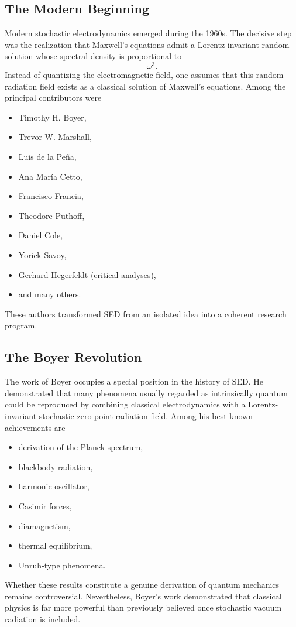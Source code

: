\subsection{The Modern Beginning}
Modern stochastic electrodynamics emerged during the 1960s.
The decisive step was the realization that Maxwell's equations admit a
Lorentz-invariant random solution whose spectral density is proportional
to
\[\omega^3.\]
Instead of quantizing the electromagnetic field, one assumes that this
random radiation field exists as a classical solution of Maxwell's
equations.
Among the principal contributors were
\begin{itemize}
\item Timothy H. Boyer,
\item Trevor W. Marshall,
\item Luis de la Peña,
\item Ana María Cetto,
\item Francisco Francia,
\item Theodore Puthoff,
\item Daniel Cole,
\item Yorick Savoy,
\item Gerhard Hegerfeldt (critical analyses),
\item and many others.
\end{itemize}
These authors transformed SED from an isolated idea into a coherent
research program.
\subsection{The Boyer Revolution}
The work of Boyer occupies a special position in the history of SED.
He demonstrated that many phenomena usually regarded as intrinsically
quantum could be reproduced by combining classical electrodynamics with
a Lorentz-invariant stochastic zero-point radiation field.
Among his best-known achievements are
\begin{itemize}
\item derivation of the Planck spectrum,
\item blackbody radiation,
\item harmonic oscillator,
\item Casimir forces,
\item diamagnetism,
\item thermal equilibrium,
\item Unruh-type phenomena.
\end{itemize}
Whether these results constitute a genuine derivation of quantum
mechanics remains controversial.
Nevertheless, Boyer's work demonstrated that classical physics is far
more powerful than previously believed once stochastic vacuum radiation
is included.
